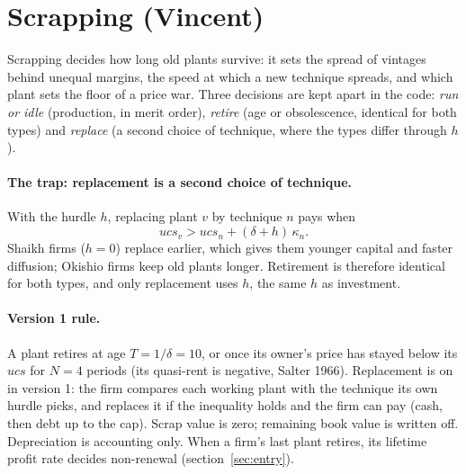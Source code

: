 \section{Scrapping (Vincent)}\label{sec:scrapping}

Scrapping decides how long old plants survive: it sets the spread of vintages behind
unequal margins, the speed at which a new technique spreads, and which plant sets the floor
of a price war. Three decisions are kept apart in the code: \emph{run or idle} (production,
in merit order), \emph{retire} (age or obsolescence, identical for both types) and
\emph{replace} (a second choice of technique, where the types differ through $h$).

\paragraph{The trap: replacement is a second choice of technique.} With the hurdle $h$,
replacing plant $v$ by technique $n$ pays when
\[
ucs_v > ucs_n + (\delta + h)\,\kappa_n .
\]
Shaikh firms ($h = 0$) replace earlier, which gives them younger capital and faster
diffusion; Okishio firms keep old plants longer. Retirement is therefore identical for both
types, and only replacement uses $h$, the same $h$ as investment.

\paragraph{Version 1 rule.} A plant retires at age $T = 1/\delta = 10$, or once its owner's
price has stayed below its $ucs$ for $N = 4$ periods (its quasi-rent is negative, Salter
1966). Replacement is on in version 1: the firm compares each working plant with the
technique its own hurdle picks, and replaces it if the inequality holds and the firm can pay
(cash, then debt up to the cap). Scrap value is zero; remaining book value is written off.
Depreciation is accounting only. When a firm's last plant retires, its lifetime profit rate
decides non-renewal (section~\ref{sec:entry}).

